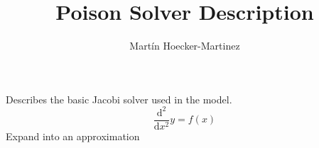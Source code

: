 \documentclass[12pt,letterpaper]{report}
\author{Mart\'in Hoecker-Martinez}
\title{Poison Solver Description}
\begin{document}
Describes the basic Jacobi solver used in the model.
\begin{equation}
\frac{\mathrm{d}^2}{\mathrm{d}x^2}y=f(x)
\end{equation}
Expand into an approximation
\end{document}
